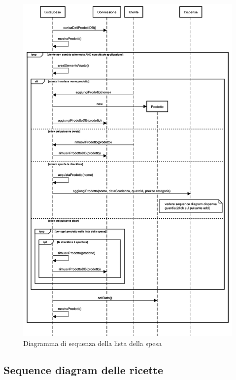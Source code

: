 \begin{figure}[H]
    \includegraphics[width=\linewidth]{images/sequence-shopping-list.png}
    \caption{Diagramma di sequenza della lista della spesa}
    \label{fig:seqshoplist}
\end{figure}

\subsection{Sequence diagram delle ricette}

